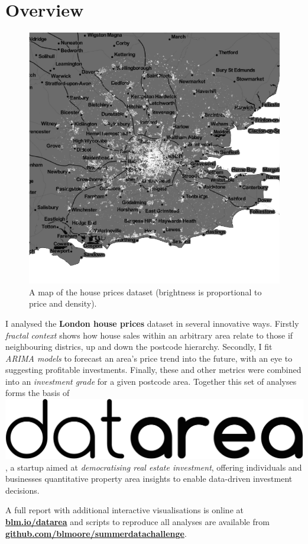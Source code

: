 \documentclass[
10pt, %
a4paper, %
oneside, %
headinclude,footinclude, %
BCOR5mm, %
]{scrartcl}
\newcommand*{\logo}{\includegraphics[scale=.04]{Figures/logotext.png}}
\begin{document}
\section*{Overview} 

\setlength{\intextsep}{0em}
\begin{figure}
\centering
\includegraphics[width=.28\textwidth]{Figures/overview.png}
\vspace{-1em}
\caption*{ A map of the house prices dataset (brightness is proportional to
  price and density).}
\end{figure}

I analysed the {\bf London house prices} dataset in several innovative
ways. Firstly \emph{fractal context} shows how house sales within an
arbitrary area relate to those if neighbouring districs, up and down
the postcode hierarchy. Secondly, I fit \emph{ARIMA models} to
forecast an area's price trend into the future, with an eye to
suggesting profitable investments. Finally, these and other metrics
were combined into an \emph{investment grade} for a given postcode
area. Together this set of analyses forms the basis of \logo, a
startup aimed at \emph{democratising real estate investment}, offering
individuals and businesses quantitative property area insights to enable
data-driven investment decisions.

A full report with additional interactive visualisations is online at {\bf
  \leavevmode\href{http://blm.io/datarea}{blm.io/datarea} }and scripts to
reproduce all analyses are available from {\bf
  \leavevmode\href{http://github.com/blmoore/summerdatachallenge}{github.com/blmoore/summerdatachallenge}}.


{\let\thefootnote\relax{}}
\end{document}
